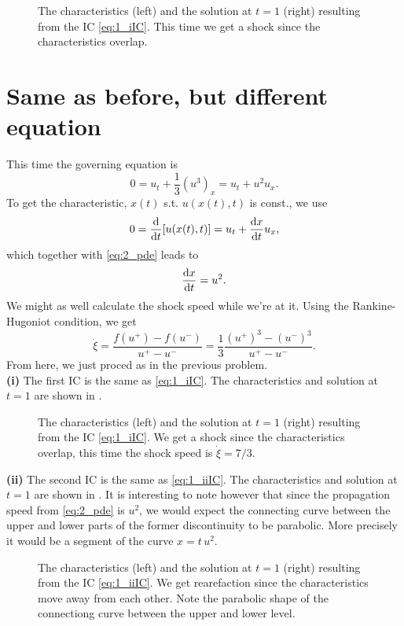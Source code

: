 \documentclass[11pt,letter, swedish, english
]{article}
\begin{document}
\begin{figure}
\centering
\resizebox{!}{3.6cm}{}
\caption{The characteristics (left) and the solution at $t=1$ (right)
  resulting from the IC \eqref{eq:1_iIC}. This time we get a shock
  since the characteristics overlap. } 
\label{fig:1ii}
\end{figure}



\section{Same as before, but different equation}
This time the governing equation is
\begin{equation}\label{eq:2_pde}
0 = u_t + \frac{1}{3} (u^3)_x = u_t + u^2u_x.
\end{equation}
To get the characteristic, $x(t)$ s.t. $u(x(t), t)$ is const., we use
\begin{equation}
0 = \dv{t} \qty[u(x(t), t)] = u_t + \dv{x}{t}u_x,
\end{equation}
which together with \eqref{eq:2_pde} leads to
\begin{equation}
\dv{x}{t} = u^2.
\end{equation}
We might as well calculate the shock speed while we're at it. Using
the Rankine-Hugoniot condition, we get
\begin{equation}
\dot\xi = \frac{f(u^+) - f(u^-) }{u^+ - u^-} 
= \frac{1}{3}\frac{(u^+)^3 - (u^-)^3}{u^+ - u^-}.
\end{equation}
From here, we just proced as in the previous problem.
\\[11pt]
\noindent
\textbf{(i) }
The first IC is the same as \eqref{eq:1_iIC}.
The characteristics and solution at $t=1$ are shown in .

\begin{figure}
\centering
\resizebox{!}{3.6cm}{}
\caption{The characteristics (left) and the solution at $t=1$ (right)
  resulting from the IC \eqref{eq:1_iIC}. We get a shock
  since the characteristics overlap, this time the shock speed is
  $\dot\xi=7/3$. } 
\label{fig:2i}
\end{figure}

\noindent
\textbf{(ii) }
The second IC is the same as \eqref{eq:1_iiIC}.
The characteristics and solution at $t=1$ are shown in
. It is interesting to note however that since the
propagation speed from \eqref{eq:2_pde} is $u^2$, we would expect the
connecting curve between the upper and lower parts of the former
discontinuity to be parabolic. More precisely it would be a segment of
the curve $x= t\,u^2$.
\begin{figure}
\centering
\resizebox{!}{3.6cm}{}
\caption{The characteristics (left) and the solution at $t=1$ (right) 
  resulting from the IC \eqref{eq:1_iiIC}. We get rearefaction since
  the characteristics move away from each other. Note the parabolic
  shape of the connectiong curve between the upper and lower level.} 
\label{fig:2ii}
\end{figure}
\end{document}
